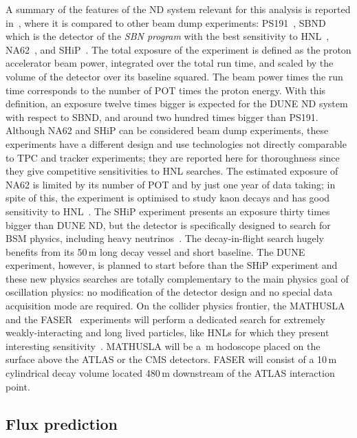 A summary of the features of the ND system relevant for this analysis is reported in~, %
where it is compared to other beam dump experiments: %
PS191~\cite{Bernardi:1985ny,Bernardi:1987ek}, SBND which is the detector of the \emph{SBN program} with the best sensitivity to %
HNL~\cite{Ballett:2016opr}, NA62~\cite{NA62:2017rwk}, and SHiP~\cite{Anelli:2015pba}.
The total exposure of the experiment is defined as the proton accelerator beam power, integrated over the total run time, %
and scaled by the volume of the detector over its baseline squared.
The beam power times the run time corresponds to the number of POT times the proton energy. 
With this definition, an exposure twelve times bigger is expected for the DUNE ND system with respect to SBND, %
and around two hundred times bigger than PS191.
Although NA62 and SHiP can be considered beam dump experiments, these experiments have a different design %
and use technologies not directly comparable to TPC and tracker experiments; %
they are reported here for thoroughness since they give competitive sensitivities to HNL searches.
The estimated exposure of NA62 is limited by its number of POT and by just one year of data taking; %
in spite of this, the experiment is optimised to study kaon decays and has good %
sensitivity to HNL~\cite{Drewes:2018irr}.
The SHiP experiment presents an exposure thirty times bigger than DUNE ND, but the detector is specifically %
designed to search for BSM physics, including heavy neutrinos~\cite{SHiP:2018xqw,Caputo:2016ojx}.
The decay-in-flight search hugely benefits from its 50\,m long decay vessel and short baseline.
The DUNE experiment, however, is planned to start before than the SHiP experiment and %
these new physics searches are totally complementary to the main physics goal of oscillation physics: %
no modification of the detector design and no special data acquisition mode are required.
On the collider physics frontier, the MATHUSLA~\cite{Curtin:2018mvb} and the FASER~\cite{Ariga:2018uku} experiments %
will perform a dedicated search for extremely weakly-interacting and long lived particles, %
like HNLs for which they present interesting sensitivity~\cite{Curtin:2018mvb, Kling:2018wct}.
MATHUSLA will be a \,m hodoscope placed on the surface above the ATLAS or the CMS detectors.
FASER will consist of a 10\,m cylindrical decay volume located 480\,m downstream of the ATLAS interaction point. 

\subsection{Flux prediction}
\label{sec:tauneutrino}


